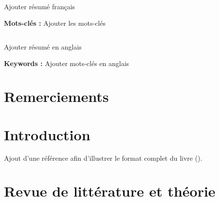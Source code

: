 \documentclass[
  12pt,
  letterpaper,
]{report}
\renewcommand*\contentsname{Table des matières}
\newcommand\contentsname{Table des matières}
\begin{document}
\section*{}
\begin{spacing}{1}

Ajouter résumé français

\end{spacing}
\vspace{1cm}

\noindent \textbf{Mots-clés :} Ajouter les mots-clés \clearpage

\section*{}

\begin{spacing}{1}

Ajouter résumé en anglais

\end{spacing}
\vspace{1cm}

\noindent \textbf{Keywords :} Ajouter mots-clés en anglais \clearpage

\renewcommand*\contentsname{Table des matières}
{
\hypersetup{linkcolor=}
\setcounter{tocdepth}{3}
\tableofcontents
}
\listoffigures
\listoftables


\chapter*{Remerciements}\label{remerciements}



\chapter{Introduction}\label{introduction}

Ajout d'une référence afin d'illustrer le format complet du livre
().


\chapter{Revue de littérature et
théorie}\label{revue-de-littuxe9rature-et-thuxe9orie}
\end{document}
